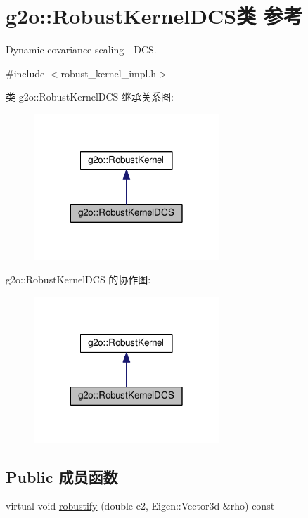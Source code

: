 \hypertarget{classg2o_1_1RobustKernelDCS}{\section{g2o\-:\-:Robust\-Kernel\-D\-C\-S类 参考}
\label{classg2o_1_1RobustKernelDCS}
}


Dynamic covariance scaling -\/ D\-C\-S.  




{\ttfamily \#include $<$robust\-\_\-kernel\-\_\-impl.\-h$>$}



类 g2o\-:\-:Robust\-Kernel\-D\-C\-S 继承关系图\-:
\nopagebreak
\begin{figure}[H]
\begin{center}
\leavevmode
\includegraphics[width=198pt]{classg2o_1_1RobustKernelDCS__inherit__graph}
\end{center}
\end{figure}


g2o\-:\-:Robust\-Kernel\-D\-C\-S 的协作图\-:
\nopagebreak
\begin{figure}[H]
\begin{center}
\leavevmode
\includegraphics[width=198pt]{classg2o_1_1RobustKernelDCS__coll__graph}
\end{center}
\end{figure}
\subsection*{Public 成员函数}
\begin{DoxyCompactItemize}
\item 
virtual void \hyperlink{classg2o_1_1RobustKernelDCS_a4b9b1d991bf3b86093dd4759a032cd78}{robustify} (double e2, Eigen\-::\-Vector3d \&rho) const 
\end{DoxyCompactItemize}
